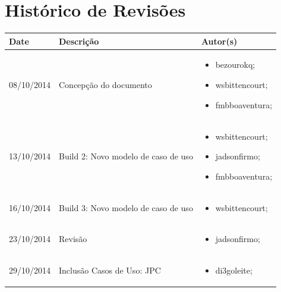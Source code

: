 \documentclass{article}
\begin{document}

\capa
\newpage

\section*{\center Histórico de Revisões}
  \vspace*{1cm}
  \begin{table}[ht]
    \centering
    \begin{tabular}[pos]{|m{2cm} | m{7.2cm} | m{3.8cm}|} 
      \hline
      \cellcolor[gray]{0.9}
      \textbf{Date} & \cellcolor[gray]{0.9}\textbf{Descrição} & \cellcolor[gray]{0.9}\textbf{Autor(s)}\\ \hline
      \hline
      \small 08/10/2014 & \small Concepção do documento & \small 
      \begin{itemize}
      	\item bezourokq;
      	\item wsbittencourt;
      	\item fmbboaventura;  
	  \end{itemize}      	
      \\ \hline
      \small 13/10/2014 & \small Build 2: Novo modelo de caso de uso & \small 
      \begin{itemize}
      	\item wsbittencourt;
      	\item jadsonfirmo;
      	\item fmbboaventura;  
	  \end{itemize}      	
      \\ \hline
      \small 16/10/2014 & \small Build 3: Novo modelo de caso de uso & \small 
      \begin{itemize}
      	\item wsbittencourt; 
	  \end{itemize}  
	  \\ \hline
	  \small 23/10/2014 & \small Revisão & \small 
      \begin{itemize}
      	\item jadsonfirmo; 
	  \end{itemize}  
	  \\ \hline
	  
	  \small 29/10/2014 & \small Inclusão Casos de Uso: JPC & \small 
	  \begin{itemize}
	  	\item di3goleite; 
	  \end{itemize}  
	  \\ \hline
	  

\end{tabular}
\end{table}
\end{document}
